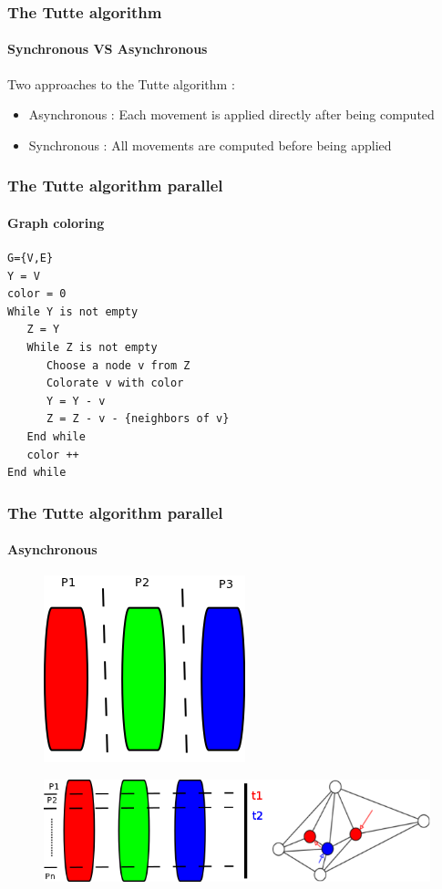 \begin{frame}
\frametitle{The Tutte algorithm}
\framesubtitle{Synchronous VS Asynchronous}
Two approaches to the Tutte algorithm :
\begin{exampleblock}{}
\begin{itemize}
\item Asynchronous : Each movement is applied directly after being computed
\item Synchronous : All movements are computed before being applied
\end{itemize}
\end{exampleblock}{}
\end{frame}

\begin{frame}[fragile]
\frametitle{The Tutte algorithm parallel}
\framesubtitle{Graph coloring}
\begin{exampleblock}{}
\begin{verbatim}
G={V,E}
Y = V
color = 0
While Y is not empty
   Z = Y
   While Z is not empty
      Choose a node v from Z
      Colorate v with color
      Y = Y - v
      Z = Z - v - {neighbors of v}
   End while
   color ++
End while
\end{verbatim}
\end{exampleblock}{}
\end{frame}

\begin{frame}
\frametitle{The Tutte algorithm parallel}
\framesubtitle{Asynchronous}
\begin{exampleblock}{}
\begin{figure}[!h]
\centering
\includegraphics[scale=0.5]{../rapport/img/distribution_verticale.png}
\end{figure}
\end{exampleblock}{}
\pause
\begin{exampleblock}{}
\begin{figure}[!h]
\centering
\includegraphics[scale=0.5]{../rapport/img/distrib.png}
\end{figure}
\end{exampleblock}{}
\end{frame}

